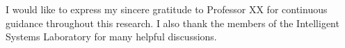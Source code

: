 \begin{acknowledgments}
I would like to express my sincere gratitude to Professor XX for continuous guidance throughout this research.
I also thank the members of the Intelligent Systems Laboratory for many helpful discussions.
\end{acknowledgments}
